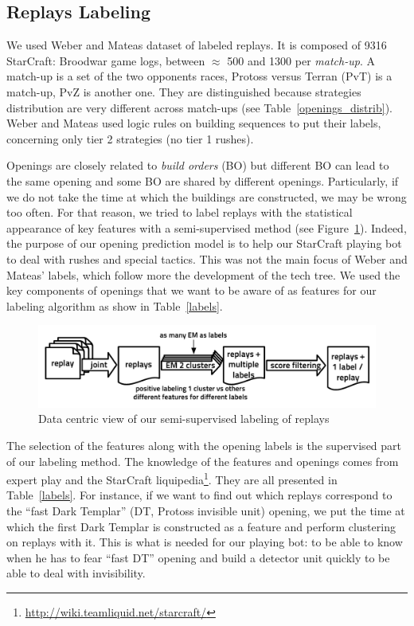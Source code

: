 \subsection{Replays Labeling}
We used Weber and Mateas \citep{weberStrat} dataset of labeled replays. It is composed of 9316 StarCraft: Broodwar game logs, between $\approx$ 500 and 1300 per \textit{match-up}. A match-up is a set of the two opponents races, Protoss versus Terran (PvT) is a match-up, PvZ is another one. They are distinguished because strategies distribution are very different across match-ups (see Table~\ref{openings_distrib}). Weber and Mateas used logic rules on building sequences to put their labels, concerning only tier 2 strategies (no tier 1 rushes).

Openings are closely related to \textit{build orders} (BO) but different BO can lead to the same opening and some BO are shared by different openings. Particularly, if we do not take the time at which the buildings are constructed, we may be wrong too often. For that reason, we tried to label replays with the statistical appearance of key features with a semi-supervised method (see Figure~\ref{replays_labeling}). Indeed, the purpose of our opening prediction model is to help our StarCraft playing bot to deal with rushes and special tactics. This was not the main focus of Weber and Mateas' labels, which follow more the development of the tech tree. We used the key components of openings that we want to be aware of as features for our labeling algorithm as show in Table~\ref{labels}.

\begin{figure}[htp]
\centerline{\includegraphics[width=1.0\columnwidth]{images/replays_labeling.pdf}}
\caption{Data centric view of our semi-supervised labeling of replays}
\label{replays_labeling}
\end{figure}

The selection of the features along with the opening labels is the supervised part of our labeling method. The knowledge of the features and openings comes from expert play and the StarCraft liquipedia\footnote{\url{http://wiki.teamliquid.net/starcraft/}}. They are all presented in Table~\ref{labels}. For instance, if we want to find out which replays correspond to the ``fast Dark Templar'' (DT, Protoss invisible unit) opening, we put the time at which the first Dark Templar is constructed as a feature and perform clustering on replays with it. This is what is needed for our playing bot: to be able to know when he has to fear ``fast DT'' opening and build a detector unit quickly to be able to deal with invisibility.


